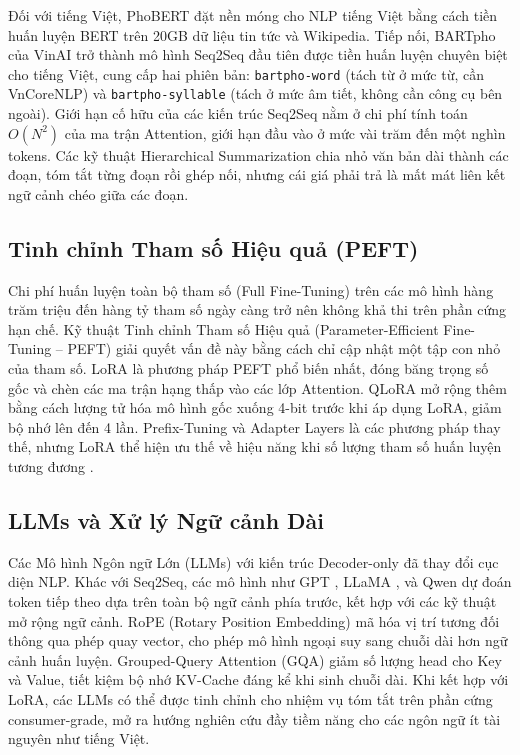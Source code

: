 \documentclass{article}
\begin{document}
Đối với tiếng Việt, PhoBERT \cite{phobert} đặt nền móng cho NLP tiếng Việt bằng cách tiền huấn luyện BERT trên 20GB dữ liệu tin tức và Wikipedia. Tiếp nối, BARTpho \cite{bartpho} của VinAI trở thành mô hình Seq2Seq đầu tiên được tiền huấn luyện chuyên biệt cho tiếng Việt, cung cấp hai phiên bản: \texttt{bartpho-word} (tách từ ở mức từ, cần VnCoreNLP) và \texttt{bartpho-syllable} (tách ở mức âm tiết, không cần công cụ bên ngoài). Giới hạn cố hữu của các kiến trúc Seq2Seq nằm ở chi phí tính toán $O(N^2)$ của ma trận Attention, giới hạn đầu vào ở mức vài trăm đến một nghìn tokens. Các kỹ thuật Hierarchical Summarization \cite{map_reduce_summarization} chia nhỏ văn bản dài thành các đoạn, tóm tắt từng đoạn rồi ghép nối, nhưng cái giá phải trả là mất mát liên kết ngữ cảnh chéo giữa các đoạn.

\subsection{Tinh chỉnh Tham số Hiệu quả (PEFT)}

Chi phí huấn luyện toàn bộ tham số (Full Fine-Tuning) trên các mô hình hàng trăm triệu đến hàng tỷ tham số ngày càng trở nên không khả thi trên phần cứng hạn chế. Kỹ thuật Tinh chỉnh Tham số Hiệu quả (Parameter-Efficient Fine-Tuning -- PEFT) giải quyết vấn đề này bằng cách chỉ cập nhật một tập con nhỏ của tham số. LoRA \cite{lora} là phương pháp PEFT phổ biến nhất, đóng băng trọng số gốc và chèn các ma trận hạng thấp vào các lớp Attention. QLoRA \cite{qlora} mở rộng thêm bằng cách lượng tử hóa mô hình gốc xuống 4-bit trước khi áp dụng LoRA, giảm bộ nhớ lên đến 4 lần. Prefix-Tuning \cite{prefix_tuning} và Adapter Layers \cite{adapter} là các phương pháp thay thế, nhưng LoRA thể hiện ưu thế về hiệu năng khi số lượng tham số huấn luyện tương đương \cite{lora}.

\subsection{LLMs và Xử lý Ngữ cảnh Dài}

Các Mô hình Ngôn ngữ Lớn (LLMs) với kiến trúc Decoder-only đã thay đổi cục diện NLP. Khác với Seq2Seq, các mô hình như GPT \cite{gpt3}, LLaMA \cite{llama}, và Qwen \cite{qwen25} dự đoán token tiếp theo dựa trên toàn bộ ngữ cảnh phía trước, kết hợp với các kỹ thuật mở rộng ngữ cảnh. RoPE (Rotary Position Embedding) \cite{rope} mã hóa vị trí tương đối thông qua phép quay vector, cho phép mô hình ngoại suy sang chuỗi dài hơn ngữ cảnh huấn luyện. Grouped-Query Attention (GQA) \cite{gqa} giảm số lượng head cho Key và Value, tiết kiệm bộ nhớ KV-Cache đáng kể khi sinh chuỗi dài. Khi kết hợp với LoRA, các LLMs có thể được tinh chỉnh cho nhiệm vụ tóm tắt trên phần cứng consumer-grade, mở ra hướng nghiên cứu đầy tiềm năng cho các ngôn ngữ ít tài nguyên như tiếng Việt.
\end{document}
